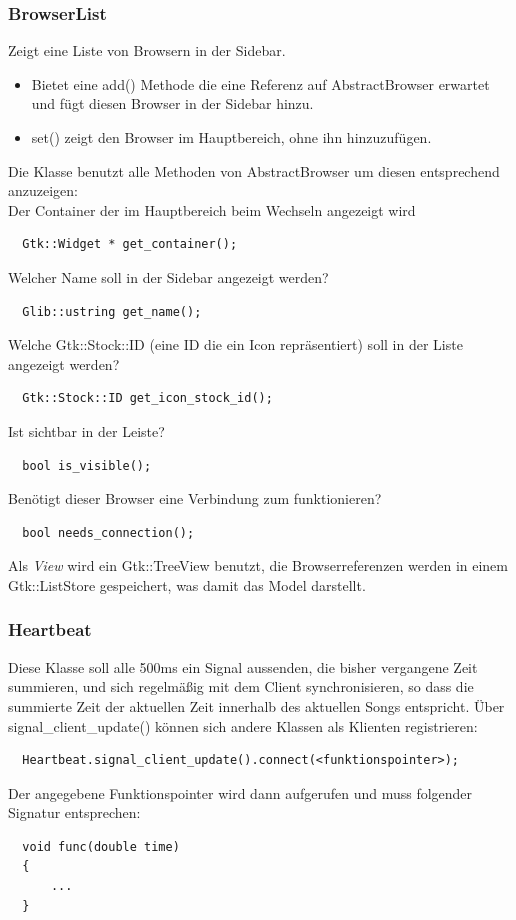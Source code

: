 \subsubsection{BrowserList}
%
%
%
Zeigt eine Liste von Browsern in der Sidebar.
\begin{itemize} 
\item Bietet eine add() Methode die eine Referenz auf AbstractBrowser erwartet und fügt diesen Browser in der Sidebar hinzu.
\item set() zeigt den Browser im Hauptbereich, ohne ihn hinzuzufügen.
\end{itemize}
Die Klasse benutzt alle Methoden von AbstractBrowser um diesen entsprechend anzuzeigen:
\\
Der Container der im Hauptbereich beim Wechseln angezeigt wird
\begin{verbatim}
  Gtk::Widget * get_container();
\end{verbatim}
Welcher Name soll in der Sidebar angezeigt werden?
\begin{verbatim}
  Glib::ustring get_name();
\end{verbatim}
Welche Gtk::Stock::ID (eine ID die ein Icon repräsentiert) soll in der Liste angezeigt werden?
\begin{verbatim}
  Gtk::Stock::ID get_icon_stock_id();
\end{verbatim} 
Ist sichtbar in der Leiste?
\begin{verbatim}
  bool is_visible(); 
\end{verbatim}
Benötigt dieser Browser eine Verbindung zum funktionieren?
\begin{verbatim}
  bool needs_connection(); 
\end{verbatim}

Als \emph{View} wird ein Gtk::TreeView benutzt, die Browserreferenzen werden in einem Gtk::ListStore gespeichert,
was damit das Model darstellt. 

\subsubsection{Heartbeat}
%
%
%
Diese Klasse soll alle 500ms ein Signal aussenden, die bisher vergangene Zeit summieren, und sich regelmäßig mit dem 
Client synchronisieren, so dass die summierte Zeit der aktuellen Zeit innerhalb des aktuellen Songs entspricht.
Über signal\_client\_update() können sich andere Klassen als Klienten registrieren:
\begin{verbatim}
  Heartbeat.signal_client_update().connect(<funktionspointer>);
\end{verbatim}
Der angegebene Funktionspointer wird dann aufgerufen und muss folgender Signatur entsprechen:
\begin{verbatim}
  void func(double time)
  {
      ...
  }
\end{verbatim}


